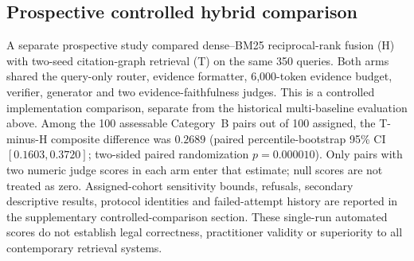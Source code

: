 \subsection{Prospective controlled hybrid comparison}
\label{subsec:matched-comparison}
A separate prospective study compared dense--BM25 reciprocal-rank fusion (H) with two-seed citation-graph retrieval (T) on the same 350 queries. Both arms shared the query-only router, evidence formatter, 6,000-token evidence budget, verifier, generator and two evidence-faithfulness judges. This is a controlled implementation comparison, separate from the historical multi-baseline evaluation above. Among the 100 assessable Category~B pairs out of 100 assigned, the T-minus-H composite difference was $0.2689$ (paired percentile-bootstrap 95\% CI $[0.1603, 0.3720]$; two-sided paired randomization $p=0.000010$). Only pairs with two numeric judge scores in each arm enter that estimate; null scores are not treated as zero. Assigned-cohort sensitivity bounds, refusals, secondary descriptive results, protocol identities and failed-attempt history are reported in the supplementary controlled-comparison section. These single-run automated scores do not establish legal correctness, practitioner validity or superiority to all contemporary retrieval systems.
